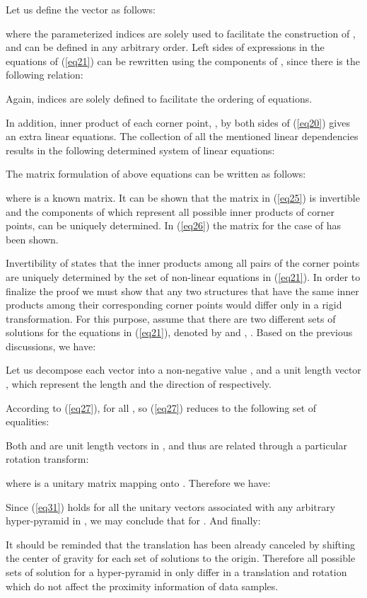 \documentclass[10pt,journal,cspaper,compsoc]{IEEEtran}
\begin{document}
Let us define the vector  as follows:

where the parameterized indices  are solely used to facilitate the construction of , and can be defined in any arbitrary order. Left sides of expressions in the equations of (\ref{eq21}) can be rewritten using the components of , since there is the following relation:


Again,  indices are solely defined to facilitate the ordering of equations.

In addition, inner product of each corner point, , by both sides of (\ref{eq20}) gives an extra  linear equations. The collection of all the mentioned linear dependencies results in the following  determined system of linear equations:


The matrix formulation of above equations can be written as follows:

where  is a known  matrix. It can be shown that the matrix  in (\ref{eq25}) is invertible and the components of  which represent all possible inner products of corner points, can be uniquely determined. In (\ref{eq26}) the  matrix for the case of  has been shown.


Invertibility of  states that the inner products among all pairs of the corner points are uniquely determined by the set of non-linear equations in (\ref{eq21}). In order to finalize the proof we must show that any two structures that have the same inner products among their corresponding corner points would differ only in a rigid transformation. For this purpose, assume that there are two different sets of solutions for the equations in (\ref{eq21}), denoted by  and , . Based on the previous discussions, we have:


Let us decompose each vector  into a non-negative value , and a unit length vector , which represent the length and the direction of  respectively.


According to (\ref{eq27}),  for all , so (\ref{eq27}) reduces to the following set of equalities:


Both  and  are unit length vectors in , and thus are related through a particular rotation transform:

where  is a  unitary matrix mapping  onto . Therefore we have:


Since (\ref{eq31}) holds for all the unitary vectors associated with any arbitrary hyper-pyramid in , we may conclude that  for . And finally:


It should be reminded that the translation has been already canceled by shifting the center of gravity for each set of solutions to the origin. Therefore all possible sets of solution for a hyper-pyramid in  only differ in a translation and rotation which do not affect the proximity information of data samples.
\end{document}

